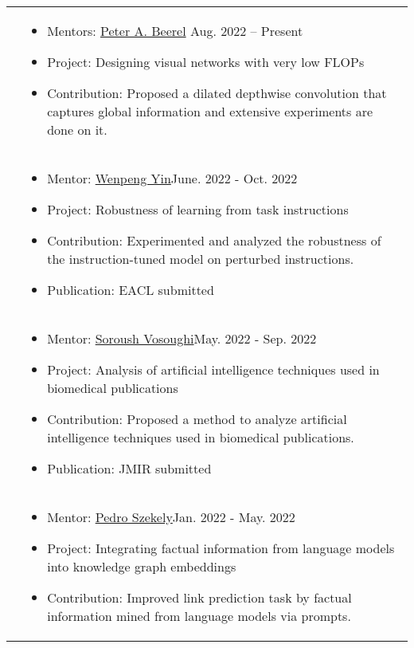 \documentclass[letterpaper, 10pt]{article}
\begin{document}
\begin{longtable}{p{1.3in}p{4.8in}}
&  \begin{itemize}[leftmargin=10pt, itemsep=-5pt, topsep=0pt,before=\textbf{University of Southern California}]
    \item Mentors: \href{https://sites.usc.edu/eessc/people/}{Peter A. Beerel} \hfill Aug. 2022 -- Present 
    \item Project: Designing visual networks with very low FLOPs
    \item Contribution: Proposed a dilated depthwise convolution that captures global information and extensive experiments are done on it.
  \end{itemize}\\ 
  

&  \begin{itemize}[leftmargin=10pt, itemsep=-5pt, topsep=0pt,before=\textbf{Pennsylvania State University}]
    \item Mentor: \href{https://www.wenpengyin.org/}{Wenpeng Yin}\hfill June. 2022 - Oct. 2022
    \item Project: Robustness of learning from task instructions\hfill
    \item Contribution: Experimented and analyzed the robustness of the instruction-tuned model on perturbed instructions.
    \item Publication: EACL submitted
  \end{itemize}\\ 

&  \begin{itemize}[leftmargin=10pt, itemsep=-5pt, topsep=0pt,before=\textbf{Dartmouth College}]
    \item Mentor: \href{https://www.cs.dartmouth.edu/~soroush//}{Soroush Vosoughi}\hfill May. 2022 - Sep. 2022
    \item Project: Analysis of artificial intelligence techniques used in biomedical publications\hfill
    \item Contribution: Proposed a method to analyze artificial intelligence techniques used in biomedical publications.
    \item Publication: JMIR submitted
  \end{itemize}\\ 
  
&  \begin{itemize}[leftmargin=10pt, itemsep=-5pt, topsep=0pt,before=\textbf{University of Southern California}]
    \item Mentor: \href{https://usc-isi-i2.github.io/szekely/}{Pedro Szekely}\hfill Jan. 2022 - May. 2022
    \item Project: Integrating factual information from language models into knowledge graph embeddings \hfill 
    \item Contribution: Improved link prediction task by factual information mined from language models via prompts.
  \end{itemize}\\ 


\end{longtable}
\end{document}
